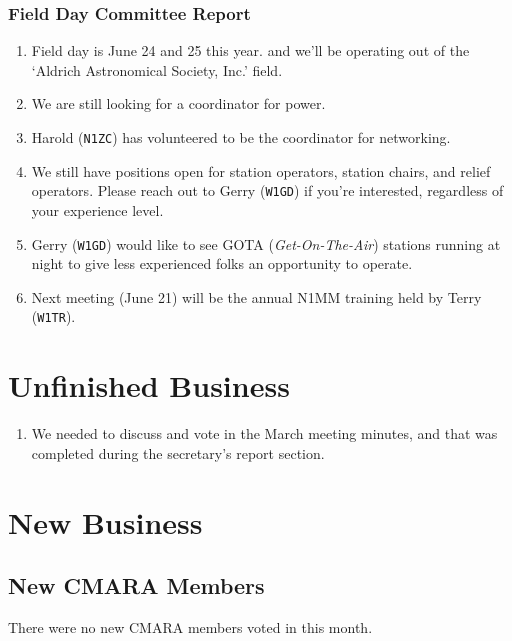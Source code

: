\documentclass[10pt,letterpaper]{article}
\begin{document}
\subsubsection{Field Day Committee Report}
\begin{enumerate}
  \item Field day is June 24 and 25 this year. and we'll be operating out of the `Aldrich Astronomical Society, Inc.' field.
  \item We are still looking for a coordinator for power.
  \item Harold (\texttt{N1ZC}) has volunteered to be the coordinator for networking.
  \item We still have positions open for station operators, station chairs, and relief operators. Please reach out to Gerry (\texttt{W1GD}) if you're interested, regardless of your experience level.
  \item Gerry (\texttt{W1GD}) would like to see GOTA (\emph{Get-On-The-Air}) stations running at night to give less experienced folks an opportunity to operate.
  \item Next meeting (June 21) will be the annual N1MM training held by Terry (\texttt{W1TR}).
\end{enumerate}

\section{Unfinished Business}
\begin{enumerate}
  \item We needed to discuss and vote in the March meeting minutes, and that was completed during the secretary's report section.
\end{enumerate}

\section{New Business}

\subsection{New CMARA Members}
\label{new-cmara-members}
There were no new CMARA members voted in this month.
\end{document}
